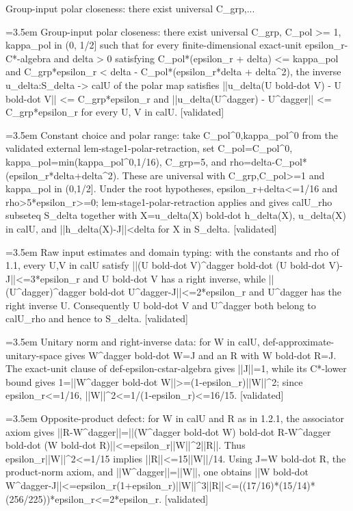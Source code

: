 \documentclass{article}
\newcommand{\step}[1]{\par\noindent\hangindent=3.5em\hangafter=1%
  \makebox[3.5em][l]{\textbf{#1.}}}
\newcommand{\steptag}[1]{\hfill{\small\textsf{[#1]}}}
\begin{document}
\begin{proofbox}{Group-input polar closeness: there exist universal C\_grp,...}
\step{1} Group-input polar closeness: there exist universal C\_grp, C\_pol >= 1, kappa\_pol in (0, 1/2] such that for every finite-dimensional exact-unit epsilon\_r-C*-algebra and delta > 0 satisfying C\_pol*(epsilon\_r + delta) <= kappa\_pol and C\_grp*epsilon\_r < delta - C\_pol*(epsilon\_r*delta + delta\textasciicircum{}2), the inverse u\_delta:S\_delta -> calU of the polar map satisfies ||u\_delta(U bold-dot V) - U bold-dot V|| <= C\_grp*epsilon\_r and ||u\_delta(U\textasciicircum{}dagger) - U\textasciicircum{}dagger|| <= C\_grp*epsilon\_r for every U, V in calU. \steptag{validated} \\[6pt]
\step{1.1} Constant choice and polar range: take C\_pol\textasciicircum{}0,kappa\_pol\textasciicircum{}0 from the validated external lem-stage1-polar-retraction, set C\_pol=C\_pol\textasciicircum{}0, kappa\_pol=min(kappa\_pol\textasciicircum{}0,1/16), C\_grp=5, and rho=delta-C\_pol*(epsilon\_r*delta+delta\textasciicircum{}2). These are universal with C\_grp,C\_pol>=1 and kappa\_pol in (0,1/2]. Under the root hypotheses, epsilon\_r+delta<=1/16 and rho>5*epsilon\_r>=0; lem-stage1-polar-retraction applies and gives calU\_rho subseteq S\_delta together with X=u\_delta(X) bold-dot h\_delta(X), u\_delta(X) in calU, and ||h\_delta(X)-J||<delta for X in S\_delta. \steptag{validated} \\[4pt]
\step{1.2} Raw input estimates and domain typing: with the constants and rho of 1.1, every U,V in calU satisfy ||(U bold-dot V)\textasciicircum{}dagger bold-dot (U bold-dot V)-J||<=3*epsilon\_r and U bold-dot V has a right inverse, while ||(U\textasciicircum{}dagger)\textasciicircum{}dagger bold-dot U\textasciicircum{}dagger-J||<=2*epsilon\_r and U\textasciicircum{}dagger has the right inverse U. Consequently U bold-dot V and U\textasciicircum{}dagger both belong to calU\_rho and hence to S\_delta. \steptag{validated} \\[6pt]
\step{1.2.1} Unitary norm and right-inverse data: for W in calU, def-approximate-unitary-space gives W\textasciicircum{}dagger bold-dot W=J and an R with W bold-dot R=J. The exact-unit clause of def-epsilon-cstar-algebra gives ||J||=1, while its C*-lower bound gives 1=||W\textasciicircum{}dagger bold-dot W||>=(1-epsilon\_r)||W||\textasciicircum{}2; since epsilon\_r<=1/16, ||W||\textasciicircum{}2<=1/(1-epsilon\_r)<=16/15. \steptag{validated} \\[4pt]
\step{1.2.2} Opposite-product defect: for W in calU and R as in 1.2.1, the associator axiom gives ||R-W\textasciicircum{}dagger||=||(W\textasciicircum{}dagger bold-dot W) bold-dot R-W\textasciicircum{}dagger bold-dot (W bold-dot R)||<=epsilon\_r||W||\textasciicircum{}2||R||. Thus epsilon\_r||W||\textasciicircum{}2<=1/15 implies ||R||<=15||W||/14. Using J=W bold-dot R, the product-norm axiom, and ||W\textasciicircum{}dagger||=||W||, one obtains ||W bold-dot W\textasciicircum{}dagger-J||<=epsilon\_r(1+epsilon\_r)||W||\textasciicircum{}3||R||<=((17/16)*(15/14)*(256/225))*epsilon\_r<=2*epsilon\_r. \steptag{validated} \\[4pt]

\end{proofbox}
\end{document}
